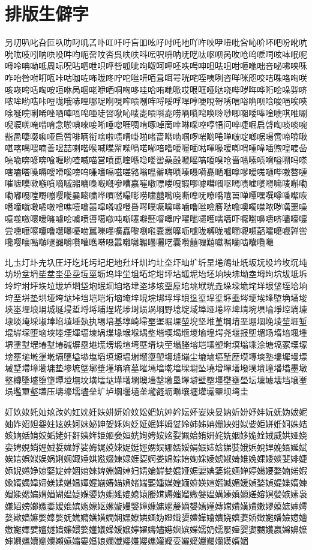 \documentclass[master]{shtthesis}
\begin{document}
\section{排版生僻字} \label{sec::chs_rare}
{\songti 叧叨叭叱叴叵叺叻叼叽叾卟叿吀吁吂吅吆吇吋吒吔吖吘吙吚吜吡吢吣吤吥吧吩吪吭吮吰吱吲呐吷吺吽呁呃呄呅呇呉呋呋呌呍呎呏呐呒呓呔呕呗呙呚呛呜呝呞呟呠呡呢呣呤呥呦呧周呩呪呫呬呭呮呯呰呱呲呴呶呵呷呸呹呺呻呾呿咀咁咂咃咄咅咇咈咉咊咋咍咎咐咑咓咔咕咖咗咘咙咚咛咜咝咞咟咠咡咢咣咤咥咦咧咨咩咪咫咬咭咮咯咰咲咳咴咵咶啕咹咺咻呙咽咾咿哂哃哅哆哇哈哊哋哌哎哏哐哑哒哓哔哕哖哗哘哙哚哛哜哝哞哟哠咔哣哤哦哧哩哪哫哬哯哰唝哵哶哷哸哹哻哼哽哾哿唀唁唂唃呗唅唆唈唉唊唋唌唍唎唏唑唒唓唔唣唖唗唘唙吣唛唜唝唞唟唠唡唢唣唤唥唦唧唨唩唪唫唬唭唯唰唲唳唴唵唶唷念唹唺唻唼唽唾唿啀啁啃啄啅啇啈啉啋啌啍啎问啐啑啒启啔啕啖啖啘啙啚啛啜啝哑启啠啡唡衔啥啦啧啨啩啪啫啬啭啮啯啰啱啲啳啴啵啶啷啹啺啻啼啽啾啿喀喁喂喃善喅喆喇喈喉喊喋喌喍喎喏喐喑喒喓喔喕喖喗喙喛喞喟喠喡喢喣喤喥喦喨喩喯喭喯喰喱哟喳喴喵営喷喸喹喺喼喽喾喿嗀嗁嗂嗃嗄嗅呛啬嗈嗉唝嗋嗌嗍吗嗏嗐嗑嗒嗓嗕嗖嗗嗘嗙呜嗛嗜嗝嗞嗟嗠嗡嗢嗧嗨唢嗪嗫嗬嗭嗮嗰嗱嗲嗳嗴嗵哔嗷嗸嗹嗺嗻嗼嗽嗾嗿嘀嘁嘂嘃嘄嘅嘅嘇嘈嘉嘊嘋嘌喽嘎嘏嘐嘑嘒嘓呕嘕啧嘘嘙嘚嘛唛嘝嘞嘞嘟嘠嘡嘢嘣嘤嘥嘦嘧嘨哗嘪嘫嘬嘭唠啸囍嘴哓嘶嘷呒嘹嘺嘻嘼啴嘾嘿噀噂噃噄咴噆噇噈噉噊噋噌噍噎噏噐噑噒嘘噔噕噖噗噘噙噚噛噜咝噞噟哒噡噢噣噤哝哕噧噩噪噫噬噭噮嗳噰噱哙噳喷噵噶噷吨噺噻噼噽噾噿咛嚁嚂嚃嚄嚅嚆吓嚈嚉嚊嚋哜嚍嚎嚏尝嚑嚒嚓嚔噜嚖嚗嚘啮嚚嚛嚜嚝嚞嚟嚠嚡嚢嚣嚤呖嚧咙嚩咙嚧嚪嚫嚬嚭嚯嚰嚱亸喾嚵嘤嚷嚸嚹嚺嚻嚼嚽嚾嚿啭嗫嚣囃囄冁囆囇呓囊囋囍囎囏囐嘱囒啮囔囕囖}

{\heiti 圠圡圢圤圥圦圧圩圪圫圬圮圯地圱圲圳圴圵圶圷圸圹圻圼埢鴪址坁坂坃坄坅坆坈坉坊坋坌坍坒坓坔坕坖坘坙坜坞坢坣坥坧坨坩坪坫坬坭坮坯垧坱坲坳坴坶坸坹坺坻坼坽坾坿垀垁垃垅垆垇垈垉垊垌垍垎垏垐垑垓垔垕垖垗垘垙垚垛垜垝垞垟垠垡垤垥垧垨垩垪垫垬垭垮垯垰垱垲垲垳垴埯垶垷垸垹垺垺垻垼垽垾垽垿埀埁埂埃埄埅埆埇埈埉埊埋埌埍城埏埐埑埒埓埔埕埖埗埘埙埚埛野埝埞域埠垭埢埣埤埥埦埧埨埩埪埫埬埭埮埯埰埱埲埳埴埵埶执埸培基埻崎埽埾埿堀堁堃堄坚堆堇堈堉垩堋堌堍堎堏堐堑堒堓堔堕垴堗堘堙堚堛堜埚堞堟堠堢堣堥堦堧堨堩堫堬堭堮尧堰报堲堳场堶堷堸堹堺堻堼堽堾堼堾碱塀塁塂塃塄塅塇塆塈塉块茔塌塍塎垲塐塑埘塓塕塖涂塘塙冢塛塜塝塟塠墘塣墘塥塦塧塨塩塪填塬塭塮塯塰塱塲塳塴尘塶塷塸堑塺塻塼塽塾塿墀墁墂墄墅墆墇墈墉垫墋墌墍墎墏墐墒墒墓墔墕墖墘墖墚墛坠墝增墠墡墢墣墤墥墦墧墨墩墪樽墬墭堕墯墰墱墲坟墴墵垯墷墸墹墺墙墼墽垦墿壀壁壂壃壄壅壆坛壈壉壊垱壌壍埙壏壐壑壒压壔壕壖壗垒圹垆壛壜壝垄壠壡坜壣壤壥壦壧壨坝塆圭}

{\kaishu 奵奺奻奼奾奿妀妁妅妉妊妋妌妍妎妏妐妑妔妕妗妘妚妛妜妟妠妡妢妤妦妧妩妫妭妮妯妰妱妲妴妵妶妷妸妺妼妽妿姀姁姂姃姄姅姆姇姈姉姊姌姗姎姏姒姕姖姘姙姛姝姞姟姠姡姢姣姤姥奸姧姨姩姫姬姭姮姯姰姱姲姳姴姵姶姷姸姹姺姻姼姽姾娀威娂娅娆娈娉娊娋娌娍娎娏娐娑娒娓娔娕娖娗娙娚娱娜娝娞娟娠娡娢娣娤娥娦娧娨娩娪娫娬娭娮娯娰娱娲娳娴娵娷娸娹娺娻娽娾娿婀娄婂婃婄婅婇婈婋婌婍婎婏婐婑婒婓婔婕婖婗婘婙婛婜婝婞婟婠婡婢婣婤婥妇婧婨婩婪婫娅婮婯婰婱婲婳婵婷婸婹婺婻婼婽婾婿媀媁媂媄媃媅媪媈媉媊媋媌媍媎媏媐媑媒媓媔媕媖媗媘媙媚媛媜媝媜媞媟媠媡媢媣媤媥媦媨媩媪媫媬媭妫媰媱媲媳媴媵媶媷媸媹媺媻媪媾嫀嫃嫄嫅嫆嫇嫈嫉嫊袅嫌嫍嫎嫏嫐嫑嫒嫓嫔嫕嫖妪嫘嫙嫚嫛嫜嫝嫞嫟嫠嫡嫢嫣嫤嫥嫦嫧嫨嫧嫩嫪嫫嫬嫭嫮嫯嫰嫱嫲嫳嫴嫳妩嫶嫷嫸嫹嫺娴嫼嫽嫾婳妫嬁嬂嬃嬄嬅嬆嬇娆嬉嬊娇嬍嬎嬏嬐嬑嬒嬓嬔嬕嬖嬗嬘嫱嬚嬛嬜嬞嬟嬠嫒嬢嬣嬥嬦嬧嬨嬩嫔嬫嬬奶嬬嬮嬯婴嬱嬲嬳嬴嬵嬶嬷婶嬹嬺嬻嬼嬽嬾嬿孀孁孂娘孄孅孆孇孆孈孉孊娈孋孊孍孎孏嫫婿媚}
\end{document}
